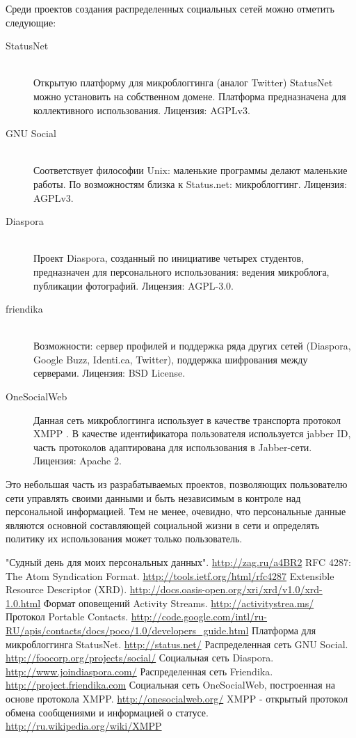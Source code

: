 \documentclass[10pt, a5paper]{article}
\begin{document}
 Среди проектов создания распределенных социальных сетей можно отметить
 следующие:
 \begin{description}
	 \item[StatusNet] \cite{zag6}\\
   Открытую платформу для микроблоггинга (аналог Twitter) StatusNet
    можно установить на собственном домене. Платформа предназначена для
    коллективного использования. Лицензия: AGPLv3.
    \item[GNU Social] \cite{zag7}\\
    Соответствует философии Unix: маленькие программы делают маленькие
    работы. По возможностям близка к Status.net: микроблоггинг. Лицензия:
    AGPLv3.
    \item[Diaspora] \cite{zag8}\\
    Проект Diaspora, созданный по инициативе четырех студентов,
    предназначен для персонального использования: ведения микроблога,
    публикации фотографий. Лицензия: AGPL-3.0.
    \item[friendika] \cite{zag9}\\
    Возможности: cервер профилей и поддержка ряда других сетей
    (Diaspora, Google Buzz, Identi.ca, Twitter), поддержка шифрования
    между серверами. Лицензия: BSD License.
    \item[OneSocialWeb] \cite{zag10}
    Данная сеть микроблоггинга использует в качестве транспорта протокол
    XMPP \cite{zag11}. В качестве идентификатора пользователя
    используется jabber ID, часть протоколов адаптирована для
    использования в Jabber-сети. Лицензия: Apache 2.
\end{description}
 Это небольшая часть из разрабатываемых проектов, позволяющих
 пользователю сети управлять своими данными и быть независимым в контроле
 над персональной информацией. Тем не менее, очевидно, что персональные
 данные являются основной составляющей социальной жизни в сети и
 определять политику их использования может только пользователь.
\begin{thebibliography}{99}
	 "Судный день для моих персональных данных". \url{http://zag.ru/a4BR2}
	 RFC 4287: The Atom Syndication Format. \url{http://tools.ietf.org/html/rfc4287}
	 Extensible Resource Descriptor (XRD). \url{http://docs.oasis-open.org/xri/xrd/v1.0/xrd-1.0.html}
	 Формат оповещений Activity Streams. \url{http://activitystrea.ms/}
	 Протокол Portable Contacts. \url{http://code.google.com/intl/ru-RU/apis/contacts/docs/poco/1.0/developers_guide.html}
	 Платформа для микроблоггинга StatusNet. \url{http://status.net/}
	 Распределенная сеть GNU Social. \url{http://foocorp.org/projects/social/}
	 Социальная сеть Diaspora. \url{http://www.joindiaspora.com/}
	 Распределенная сеть Friendika. \url{http://project.friendika.com}
	 Социальная сеть OneSocialWeb, построенная на основе протокола XMPP. \url{http://onesocialweb.org/}
	 XMPP - открытый протокол обмена сообщениями и информацией о статусе. \url{http://ru.wikipedia.org/wiki/XMPP}
\end{thebibliography}
\end{document}
